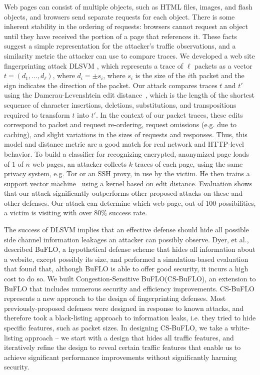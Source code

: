 \documentclass[11pt,oneside]{article}
\newcommand{\buflo} {BuFLO\xspace}
\newcommand{\csbuflo} {Congestion-Sensitive BuFLO\xspace}
\newcommand{\csb} {CS-BuFLO\xspace}
\begin{document}
Web pages can consist of multiple objects, such as HTML files, images, and flash objects, and browsers send separate requests for each object. There is some inherent stability in the ordering of requests: browsers cannot request an object until they have received the portion of a page that references it. These facts suggest a simple representation for the attacker's traffic observations, and a similarity metric the attacker can use to compare traces.  We developed a web site fingerprinting attack DLSVM \cite{cai-ccs12}, which represents a trace of $\ell$ packets as a vector $t=(d_1, \ldots, d_\ell)$, where $d_i=\pm s_i$, where $s_i$ is the size of the $i$th packet and the sign indicates the direction of the packet.  Our attack compares traces $t$ and $t'$ using the Damerau-Levenshtein edit distance~\cite{navarro-acmcs01}, which is the length of the shortest sequence of character insertions, deletions, substitutions, and transpositions required to transform $t$ into $t'$. In the context of our packet traces, these edits correspond to packet and request re-ordering, request omissions (e.g. due to caching), and slight variations in the sizes of requests and responses. Thus, this model and distance metric are a good match for real network and HTTP-level behavior. To build a classifier for recognizing encrypted, anonymized page loads of 1 of $n$ web pages, an attacker collects $k$ traces of each page, using the same privacy system, e.g. Tor or an SSH proxy, in use by the victim.  He then trains a support vector machine~\cite{vapnik-svm95} using a kernel based on edit distance. Evaluation shows that our attack significantly outperforms other proposed attacks on these and other defenses. Our attack can determine which web page, out of 100 possibilities, a victim is visiting with over 80\% success rate.

The success of DLSVM implies that an effective defense should hide all possible side channel information leakages an attacker can possibly observe. Dyer, et al., described \buflo, a hypothetical defense scheme that hides all information about a website, except possibly its size, and performed a simulation-based evaluation that found that, although \buflo is able to offer good security, it incurs a high cost to do so. We built \csbuflo (\csb), an extension to \buflo that
includes numerous security and efficiency improvements.  \csb represents a new approach to the design of fingerprinting defenses.
Most previously-proposed defenses were designed in response to known attacks, and therefore took a black-listing approach to information leaks, i.e. they tried to hide specific features, such as packet sizes.  In designing \csb, we take a white-listing approach -- we start with a design that hides all traffic features, and iteratively refine the design to reveal certain traffic features that enable us to achieve significant performance improvements without significantly harming security. 
\end{document}
